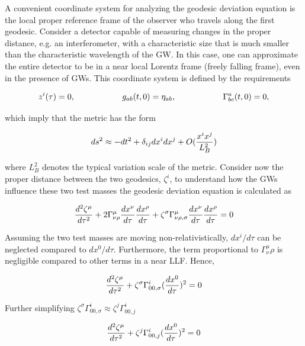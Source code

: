 \documentclass[binding=0.6cm, LaM]{sapthesis}
\begin{document}
	A convenient coordinate system for analyzing the geodesic deviation equation is the 
	local proper reference frame of the observer who travels along the first geodesic.
	Consider a detector capable of measuring changes in the proper distance, e.g. an interferometer, 
	with a characteristic size that is much smaller than the characteristic wavelength of the GW.
	In this case, one can approximate the entire detector to be in a near local Lorentz frame  
	(freely falling frame), even in the presence of GWs. This coordinate system is defined by the requirements

		\begin{equation}
		z^i(\tau) = 0, \hspace*{2cm} g_{ab}(t, 0) = \eta_{ab}, \hspace*{2cm} \Gamma^a_{bc}(t,0) = 0,
		\end{equation}

	which imply that the metric has the form

		\begin{equation}
		ds^2 \approx -dt^2 + \delta_{ij}dx^i dx^j + O({{x^ix^j}\over{L^2_B}})
		\end{equation}

	where $L^2_B$ denotes the typical variation scale of the metric.
	Consider now the proper distance between the two geodesics, $\zeta^i$, 
	to understand how the GWs influence these two test masses the geodesic deviation equation is calculated as

		\begin{equation}
		{{d^2\zeta^{\mu}}\over{d\tau^2}} + 2\Gamma^{\mu}_{\nu\rho}{{dx^{\nu}}\over{d\tau}}{{dx^\rho}\over{d\tau}} + \zeta^{\sigma}\Gamma^{\mu}_{\nu\rho,\sigma}{{dx^{\nu}}\over{d\tau}}{{dx^{\rho}}\over{d\tau}} = 0
		\end{equation}

	Assuming the two test masses are moving non-relativistically, $dx^i/d\tau$ can be neglected compared to $dx^0/d\tau$.
	Furthermore, the term proportional to $\Gamma^{\mu}_\nu\rho{}$ is negligible compared to other terms in a near LLF. Hence,

		\begin{equation}
		{{d^2\zeta^{\mu}}\over{d\tau^2}} + \zeta^{\sigma}\Gamma^{i}_{00, \sigma}({{dx^0}\over{d\tau}})^2 = 0
		\end{equation}

	Further simplifying $\zeta^{\sigma}\Gamma^{i}_{00, \sigma} \approx \zeta^{j}\Gamma^{i}_{00, j}$

		\begin{equation}
		{{d^2\zeta^{\mu}}\over{d\tau^2}} + \zeta^{j}\Gamma^{i}_{00,j}({{dx^0}\over{d\tau}})^2 = 0
		\end{equation}
\end{document}
